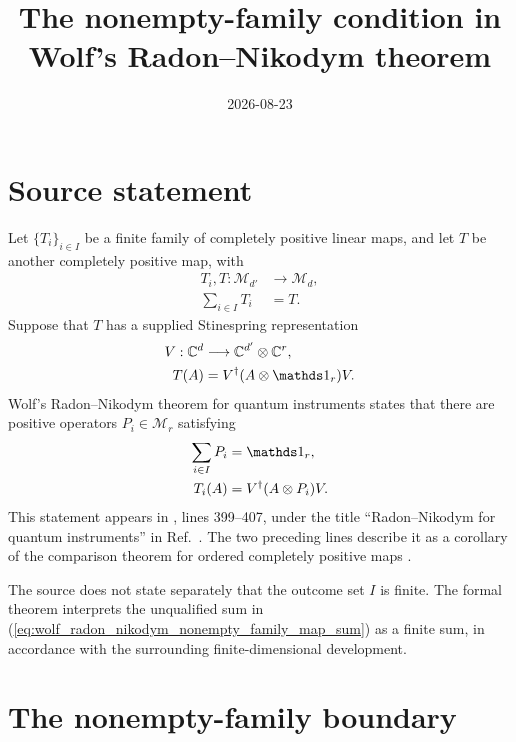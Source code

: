 \documentclass{article}
\title{The nonempty-family condition in Wolf's Radon--Nikodym theorem}
\author{}
\date{2026-08-23}
\begin{document}
\maketitle
{}

\section{Source statement}

Let $\{T_i\}_{i\in I}$ be a finite family of completely positive linear maps,
and let $T$ be another completely positive map, with
\begin{align}
    T_i,T:\mathcal M_{d'}&\longrightarrow\mathcal M_d,
    \label{eq:wolf_radon_nikodym_nonempty_family_map_types}\\
    \sum_{i\in I}T_i&=T.
    \label{eq:wolf_radon_nikodym_nonempty_family_map_sum}
\end{align}
Suppose that $T$ has a supplied Stinespring representation
\begin{align}
    V:\C^d&\longrightarrow\C^{d'}\otimes\C^r,
    \label{eq:wolf_radon_nikodym_nonempty_family_stinespring_map}\\
    T(A)&=V^\dagger(A\otimes\Id_r)V.
    \label{eq:wolf_radon_nikodym_nonempty_family_stinespring_formula}
\end{align}
Wolf's Radon--Nikodym theorem for quantum instruments states that there are
positive operators $P_i\in\mathcal M_r$ satisfying
\begin{align}
    \sum_{i\in I}P_i&=\Id_r,
    \label{eq:wolf_radon_nikodym_nonempty_family_effect_resolution}\\
    T_i(A)&=V^\dagger(A\otimes P_i)V.
    \label{eq:wolf_radon_nikodym_nonempty_family_component_representation}
\end{align}
This statement appears in
, lines 399--407, under
the title ``Radon--Nikodym for quantum instruments'' in
Ref.~\cite{Wolf2012Quantum}. The two preceding lines describe it as a corollary
of the comparison theorem for ordered completely positive maps
\cite{Wolf2012Quantum}.

The source does not state separately that the outcome set $I$ is finite. The
formal theorem interprets the unqualified sum in
(\ref{eq:wolf_radon_nikodym_nonempty_family_map_sum}) as a finite sum, in
accordance with the surrounding finite-dimensional development.

\section{The nonempty-family boundary}
\end{document}
